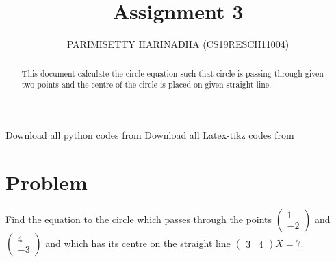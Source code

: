 \documentclass[journal,12pt,twocolumn]{IEEEtran}
\title{Assignment 3}
\author{PARIMISETTY HARINADHA (CS19RESCH11004)}
\newcommand{\myvec}[1]{\ensuremath{\begin{pmatrix}#1\end{pmatrix}}}
\begin{document}
\maketitle
\newpage
\begin{abstract}
This document calculate the circle equation such that circle is passing through given two points and the centre of the circle is placed on given straight line.
\end{abstract}
Download all python codes from 
Download all Latex-tikz codes from 
\section{Problem}
Find the equation to the circle which passes through the points $\myvec{ 1 \\ -2 }$ and $\myvec{ 4 \\ -3 }$ and which has its centre on the straight line $\myvec{ 3 & 4 }X = 7$.
\end{document}
